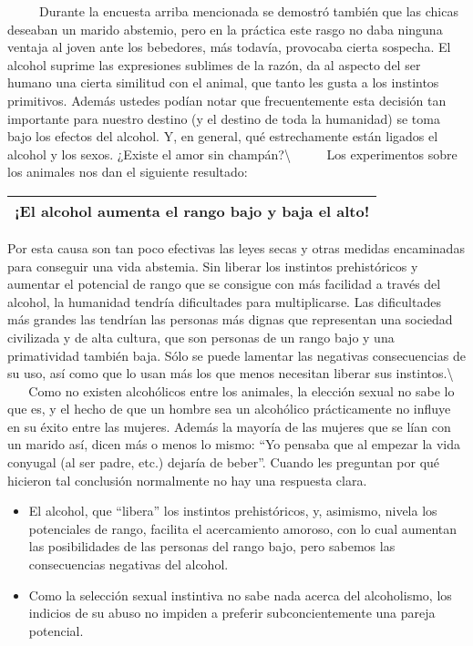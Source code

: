 ~ ~ ~ Durante la encuesta arriba mencionada se demostró también que las
chicas deseaban un marido abstemio, pero en la práctica este rasgo no
daba ninguna ventaja al joven ante los bebedores, más todavía, provocaba
cierta sospecha. El alcohol suprime las expresiones sublimes de la
razón, da al aspecto del ser humano una cierta similitud con el animal,
que tanto les gusta a los instintos primitivos. Además ustedes podían
notar que frecuentemente esta decisión tan importante para nuestro
destino (y el destino de toda la humanidad) se toma bajo los efectos del
alcohol. Y, en general, qué estrechamente están ligados el alcohol y los
sexos. ¿Existe el amor sin champán?\textbackslash{} ~ ~ ~ Los
experimentos sobre los animales nos dan el siguiente resultado:

\begin{longtable}[]{@{}l@{}}
\toprule
¡El alcohol aumenta el rango bajo y baja el alto!\tabularnewline
\bottomrule
\end{longtable}

Por esta causa son tan poco efectivas las leyes secas y otras medidas
encaminadas para conseguir una vida abstemia. Sin liberar los instintos
prehistóricos y aumentar el potencial de rango que se consigue con más
facilidad a través del alcohol, la humanidad tendría dificultades para
multiplicarse. Las dificultades más grandes las tendrían las personas
más dignas que representan una sociedad civilizada y de alta cultura,
que son personas de un rango bajo y una primatividad también baja. Sólo
se puede lamentar las negativas consecuencias de su uso, así como que lo
usan más los que menos necesitan liberar sus instintos.\textbackslash{}
~ ~ ~ Como no existen alcohólicos entre los animales, la elección sexual
no sabe lo que es, y el hecho de que un hombre sea un alcohólico
prácticamente no influye en su éxito entre las mujeres. Además la
mayoría de las mujeres que se lían con un marido así, dicen más o menos
lo mismo: ``Yo pensaba que al empezar la vida conyugal (al ser padre,
etc.) dejaría de beber''. Cuando les preguntan por qué hicieron tal
conclusión normalmente no hay una respuesta clara.

\begin{itemize}
\tightlist
\item
  El alcohol, que ``libera'' los instintos prehistóricos, y, asimismo,
  nivela los potenciales de rango, facilita el acercamiento amoroso, con
  lo cual aumentan las posibilidades de las personas del rango bajo,
  pero sabemos las consecuencias negativas del alcohol.
\item
  Como la selección sexual instintiva no sabe nada acerca del
  alcoholismo, los indicios de su abuso no impiden a preferir
  subconcientemente una pareja potencial.
\end{itemize}

